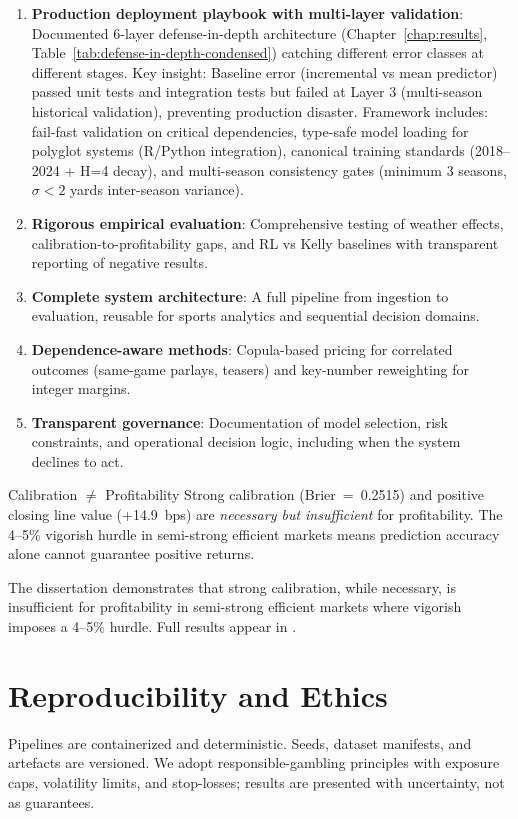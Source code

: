 \begin{enumerate}
  \item \textbf{Production deployment playbook with multi-layer validation}: Documented 6-layer defense-in-depth architecture (Chapter~\ref{chap:results}, Table~\ref{tab:defense-in-depth-condensed}) catching different error classes at different stages. Key insight: Baseline error (incremental vs mean predictor) passed unit tests and integration tests but failed at Layer 3 (multi-season historical validation), preventing production disaster. Framework includes: fail-fast validation on critical dependencies, type-safe model loading for polyglot systems (R/Python integration), canonical training standards (2018--2024 + H=4 decay), and multi-season consistency gates (minimum 3 seasons, $\sigma < 2$ yards inter-season variance).

  \item \textbf{Rigorous empirical evaluation}: Comprehensive testing of weather effects, calibration-to-profitability gaps, and RL vs Kelly baselines with transparent reporting of negative results.
  \item \textbf{Complete system architecture}: A full pipeline from ingestion to evaluation, reusable for sports analytics and sequential decision domains.
  \item \textbf{Dependence-aware methods}: Copula-based pricing for correlated outcomes (same-game parlays, teasers) and key-number reweighting for integer margins.
  \item \textbf{Transparent governance}: Documentation of model selection, risk constraints, and operational decision logic, including when the system declines to act.
\end{enumerate}

\begin{keyfinding}{Calibration $\neq$ Profitability}
Strong calibration (Brier~=~0.2515) and positive closing line value (+14.9~bps) are \emph{necessary but insufficient} for profitability. The 4--5\% vigorish hurdle in semi-strong efficient markets means prediction accuracy alone cannot guarantee positive returns.
\end{keyfinding}

\noindent The dissertation demonstrates that strong calibration, while necessary, is insufficient for profitability in semi-strong efficient markets where vigorish imposes a 4--5\% hurdle. Full results appear in .

\section{Reproducibility and Ethics}
Pipelines are containerized and deterministic. Seeds, dataset manifests, and artefacts are versioned. We adopt responsible-gambling principles with exposure caps, volatility limits, and stop-losses; results are presented with uncertainty, not as guarantees.

